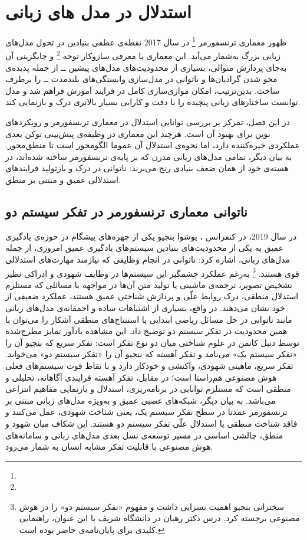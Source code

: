 \section{استدلال در مدل های زبانی}
ظهور معماری ترنسفورمر
\footnote{}
\cite{b8}
در سال 2017 نقطه‌ی عطفی بنیادین در تحول مدل‌های زبانی بزرگ به‌شمار می‌آید. این معماری با معرفی سازوکار توجه
\footnote{}
و جایگزینی آن به‌جای پردازش متوالی، بسیاری از محدودیت‌های مدل‌های پیشین ــ از جمله پدیده‌ی محو شدن گرادیان‌ها و ناتوانی در مدل‌سازی وابستگی‌های بلندمدت ــ را برطرف ساخت. بدین‌ترتیب، امکان موازی‌سازی کامل در فرایند آموزش فراهم شد و مدل توانست ساختارهای زبانی پیچیده را با دقت و کارایی بسیار بالاتری درک و بازنمایی کند.    

در این فصل، تمرکز بر بررسی توانایی استدلال در معماری ترنسفورمر و رویکردهای نوین برای بهبود آن است. هرچند این معماری در وظیفه‌ی پیش‌بینی توکن بعدی عملکردی خیره‌کننده دارد، اما نحوه‌ی استدلال آن عموما الگومحور است تا منطق‌محور. به بیان دیگر، تمامی مدل‌های زبانی مدرن که بر پایه‌ی ترنسفورمر ساخته شده‌اند، در هسته‌ی خود از همان ضعف بنیادی رنج می‌برند: ناتوانی در درک و بازتولید فرایندهای استدلالی عمیق و مبتنی بر منطق.

\subsection{ناتوانی معماری ترنسفورمر در تفکر سیستم دو}
در سال 2019، در کنفرانس
،
یوشوا بنجیو یکی از چهره‌های پیشگام در حوزه‌ی یادگیری عمیق به یکی از محدودیت‌های بنیادین سیستم‌های یادگیری عمیق امروزی، از جمله مدل‌های زبانی، اشاره کرد: ناتوانی در انجام وظایفی که نیازمند مهارت‌های استدلالی قوی هستند.
\cite{b25}
\footnote{سخنرانی بنجیو اهمیت بسزایی داشت و مفهوم «تفکر سیستم دو» را در هوش مصنوعی برجسته کرد. درس دکتر رهبان در دانشگاه شریف با این عنوان، راهنمایی کلیدی برای پایان‌نامه‌ی حاضر بوده است.}
به‌رغم عملکرد چشمگیر این سیستم‌ها در وظایف شهودی و ادراکی نظیر تشخیص تصویر، ترجمه‌ی ماشینی یا تولید متن آن‌ها در مواجهه با مسائلی که مستلزم استدلال منطقی، درک روابط علّی و پردازش شناختی عمیق هستند، عملکرد ضعیفی از خود نشان می‌دهند. در واقع، بسیاری از اشتباهات ساده و احمقانه‌ی مدل‌های زبانی مانند ناتوانی در حل مسائل ریاضی ابتدایی یا استنتاج‌های منطقی آشکار را می‌توان با همین محدودیت در تفکر سیستم دو توضیح داد.
این مشاهده یادآور تمایز مطرح‌شده توسط دنیل کانمن در علوم شناختی
\cite{b26}
میان دو نوع تفکر است: تفکر سریع که بنجیو آن را «تفکر سیستم یک» می‌نامد و تفکر آهسته که بنجیو آن را «تفکر سیستم دو» می‌خواند. تفکر سریع، ماهیتی شهودی، واکنشی و خودکار دارد و با نقاط قوت سیستم‌های فعلی هوش مصنوعی هم‌راستا است؛ در مقابل، تفکر آهسته فرایندی آگاهانه، تحلیلی و منطقی است که مستلزم توانایی در برنامه‌ریزی، استدلال و بازنمایی مفاهیم انتزاعی می‌باشد.
به بیان دیگر، شبکه‌های عصبی عمیق و به‌ویژه مدل‌های زبانی مبتنی بر ترنسفورمر عمدتا در سطح تفکر سیستم یک، یعنی شناخت شهودی، عمل می‌کنند و فاقد شناخت منطقی یا استدلال علّی تفکر سیستم دو هستند. این شکاف میان شهود و منطق، چالشی اساسی در مسیر توسعه‌ی نسل بعدی مدل‌های زبانی و سامانه‌های هوش مصنوعی با قابلیت تفکر مشابه انسان به شمار می‌رود.

